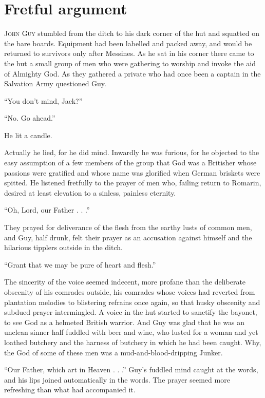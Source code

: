 \chapter*{\textsf{Fretful argument}}

J\textsc{ohn} G\textsc{uy} stumbled from the ditch to his dark corner of the hut and squatted on the bare boards. Equipment had been labelled and packed away, and would be returned to survivors only after Messines. As he sat in his corner there came to the hut a small group of men who were gathering to worship and invoke the aid of Almighty God. As they gathered a private who had once been a captain in the Salvation Army questioned Guy.

``You don't mind, Jack?''

``No. Go ahead.''

He lit a candle.

Actually he lied, for he did mind. Inwardly he was furious, for he objected to the easy assumption of a few members of the group that God was a Britisher whose passions were gratified and whose name was glorified when German briskets were spitted. He listened fretfully to the prayer of men who, failing return to Romarin, desired at least elevation to a sinless, painless eternity.

``Oh, Lord, our Father . . .''

They prayed for deliverance of the flesh from the earthy lusts of common men, and Guy, half drunk, felt their prayer as an accusation against himself and the hilarious tipplers outside in the ditch.

``Grant that we may be pure of heart and flesh.''

The sincerity of the voice seemed indecent, more profane than the deliberate obscenity of his comrades outside, his comrades whose voices had reverted from plantation melodies to blistering refrains once again, so that husky obscenity and subdued prayer intermingled. A voice in the hut started to sanctify the bayonet, to see God as a helmeted British warrior. And Guy was glad that he was an unclean sinner half fuddled with beer and wine, who lusted for a woman and yet loathed butchery and the harness of butchery in which he had been caught. Why, the God of some of these men was a mud-and-blood-dripping Junker.

``Our Father, which art in Heaven . . .'' Guy's fuddled mind caught at the words, and his lips joined automatically in the words. The prayer seemed more refreshing than what had accompanied it.

